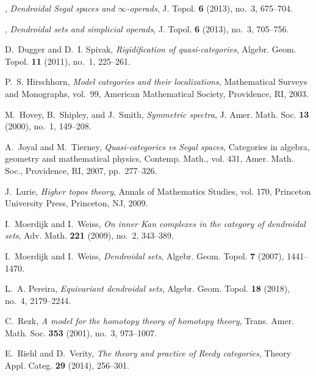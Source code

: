 \documentclass[a4paper,10pt]{article}%
\numberwithin{equation}{section}
\numberwithin{figure}{section}
\theoremstyle{definition} %
\newcommand{\1}{\ensuremath{\mathbbm 1}}%
\begin{document}
\begin{thebibliography}{CM13b}
	\bysame, \emph{Dendroidal {S}egal spaces and {$\infty$}-operads}, J. Topol.
	\textbf{6} (2013), no.~3, 675--704. 
	
	\bysame, \emph{Dendroidal sets and simplicial operads}, J. Topol. \textbf{6}
	(2013), no.~3, 705--756. 
	
	D.~Dugger and D.~I. Spivak, \emph{Rigidification of quasi-categories}, Algebr.
	Geom. Topol. \textbf{11} (2011), no.~1, 225--261.
	
	P.~S. Hirschhorn, \emph{Model categories and their localizations}, Mathematical
	Surveys and Monographs, vol.~99, American Mathematical Society, Providence,
	RI, 2003.
	
	M.~Hovey, B.~Shipley, and J.~Smith, \emph{Symmetric spectra}, J. Amer. Math.
	Soc. \textbf{13} (2000), no.~1, 149--208. 
	
	A.~Joyal and M.~Tierney, \emph{Quasi-categories vs {S}egal spaces}, Categories
	in algebra, geometry and mathematical physics, Contemp. Math., vol. 431,
	Amer. Math. Soc., Providence, RI, 2007, pp.~277--326.
	
	J.~Lurie, \emph{Higher topos theory}, Annals of Mathematics Studies, vol. 170,
	Princeton University Press, Princeton, NJ, 2009. 
	
	I.~Moerdijk and I.~Weiss, \emph{On inner {K}an complexes in the category of
		dendroidal sets}, Adv. Math. \textbf{221} (2009), no.~2, 343--389.
	
	I.~Moerdijk and I.~Weiss, \emph{Dendroidal sets}, Algebr. Geom. Topol.
	\textbf{7} (2007), 1441--1470. 
	
	L.~A. Pereira, \emph{Equivariant dendroidal sets}, Algebr. Geom. Topol.
	\textbf{18} (2018), no.~4, 2179--2244. 
	
	C.~Rezk, \emph{A model for the homotopy theory of homotopy theory}, Trans.
	Amer. Math. Soc. \textbf{353} (2001), no.~3, 973--1007.
	
	E.~Riehl and D.~Verity, \emph{The theory and practice of {R}eedy categories},
	Theory Appl. Categ. \textbf{29} (2014), 256--301.
	

\end{thebibliography}
\end{document}
